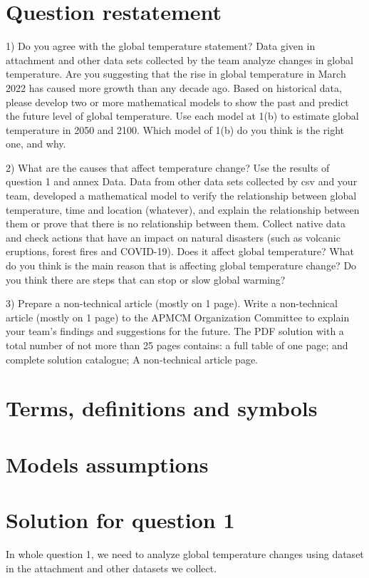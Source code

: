 \documentclass{apmcmthesis}
\begin{document}
\section{Question restatement}

1) Do you agree with the global temperature statement? 
Data given in attachment and other data sets collected by the team analyze changes in global temperature.
Are you suggesting that the rise in global temperature in March 2022 has caused more growth than any decade ago.
Based on historical data, please develop two or more mathematical models to show the past and predict the future level of global temperature.
Use each model at 1(b) to estimate global temperature in 2050 and 2100.
Which model of 1(b) do you think is the right one, and why.

2) What are the causes that affect temperature change?
Use the results of question 1 and annex Data. 
Data from other data sets collected by csv and your team, developed a mathematical model to verify the relationship between global temperature, 
time and location (whatever), and explain the relationship between them or prove that there is no relationship between them.
Collect native data and check actions that have an impact on natural disasters (such as volcanic eruptions, forest fires and COVID-19). 
Does it affect global temperature? 
What do you think is the main reason that is affecting global temperature change?
Do you think there are steps that can stop or slow global warming?

3) Prepare a non-technical article (mostly on 1 page). Write a non-technical article (mostly on 1 page) 
to the APMCM Organization Committee to explain your team's findings and suggestions for the future.
The PDF solution with a total number of not more than 25 pages contains: 
a full table of one page; and complete solution catalogue; A non-technical article page.

\section{Terms, definitions and symbols}

\section{Models assumptions}

\section{Solution for question 1}
In whole question 1, we need to analyze global temperature changes using dataset in the attachment and other datasets we collect.
\end{document}
